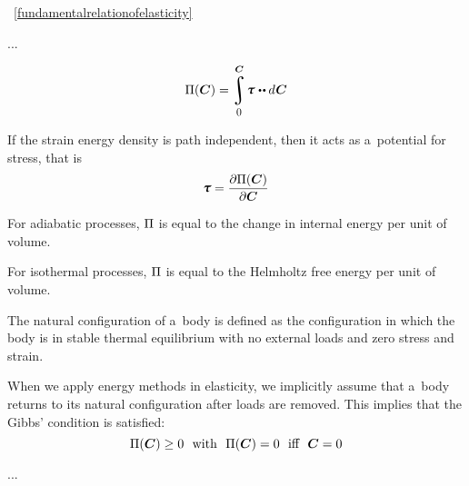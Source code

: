 

~\eqref{fundamentalrelationofelasticity}

...

{\small

\[ \potentialenergydensity (\bm{C}) = \displaystyle \integral_{\raisemath{-0.25em}{\hspace{-0.1ex}\scalebox{0.85}{$0$}}}^{\raisemath{.15em}{\bm{C}}} \hspace{-0.25ex} \cauchystress \hspace{.1ex} \dotdotp d \hspace{.1ex} \boldsymbol{\bm{C}} \]

If the strain energy density is path independent, then it acts as a~potential for stress, that is
\[ \displaystyle \cauchystress = {\frac{\partial \potentialenergydensity (\bm{C})}{\partial \bm{C}}} \]

For adiabatic processes, ${\Pi}$ is equal to the change in internal energy per unit of volume.

For isothermal processes, ${\Pi}$ is equal to the Helmholtz free energy per unit of volume.

The natural configuration of a~body is defined as the configuration in which the body is in stable thermal equilibrium with no external loads and zero stress and strain.

When we apply energy methods in elasticity, we implicitly assume that a~body returns to its natural configuration after loads are removed. This implies that the Gibbs’ condition is satisfied:
\[ \Pi (\bm{C}) \geq 0~~{\text{with}}~~\Pi (\bm{C}) = 0~~{\text{iff}}~~\bm{C} = 0 \]

\par}

...

